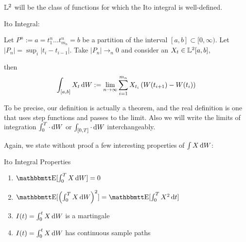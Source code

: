 ${\mathbb{L}^2}$ will be the class of functions for which the Ito integral is
well-defined. 
\begin{defn} Ito Integral:
\label{defn:ito_integral}

Let $P^n := {a = t^n_1 \ldots t^n_{m_n} = b}$ be a partition of the interval
$[a,b] \subset [0, \infty)$. Let $|P_n| = \sup_i|t_i - t_{i-1}|$. 
Take $|P_n| \rightarrow_n 0 $ and consider an $ X_t \in {\mathbb{L}^2}[a,b]$,

then
\begin{equation}
\int_{[a,b]} X_t \, \mathrm{d} W := \lim_{n \rightarrow \infty}  
\sum_{i=1}^{m_n} X_{t_i}\left( W(t_{i+1}) - W(t_{i})\right)
\end{equation}

\end{defn}

To be precise, our definition is actually a theorem, and the real
definition is one that uses step functions and passes to the limit.  Also we
will write the limits of integration $\int_0^T \cdot  \, \mathrm{d} W$ or $\int_{[0,T]}
\cdot  \, \mathrm{d} W$ interchangeably.

Again, we state without proof a few interesting properties of $\int X \, \mathrm{d} W$:
\begin{thm} Ito Integral Properties

\begin{enumerate}
  \item $\Exp[\int_0^T X \intd{W} ] = 0$ 
  \item $\Exp[\left(\int_0^T X \intd{W}\right)^2 ] = \Exp[\int_0^T X^2
  \intd{t}]$
  \item $I(t) = \int_0^t X \, \mathrm{d} W $ is a martingale 
  \item $I(t) = \int_0^t X \, \mathrm{d} W $ has continuous sample paths
\end{enumerate}
\end{thm}

